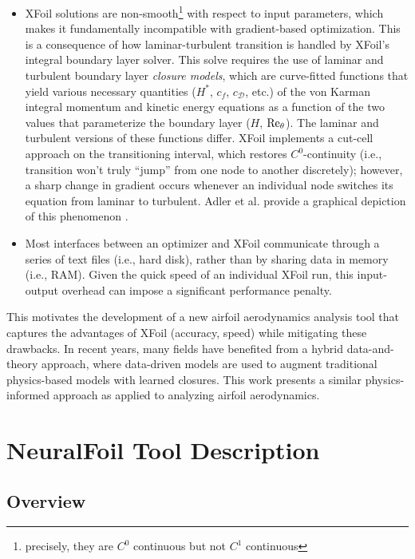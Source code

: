 \documentclass[conf]{new-aiaa}
\begin{document}
\begin{itemize}
        \item XFoil solutions are non-smooth\footnote{precisely, they are $C^0$ continuous but not $C^1$ continuous} with respect to input parameters, which makes it fundamentally incompatible with gradient-based optimization. This is a consequence of how laminar-turbulent transition is handled by XFoil's integral boundary layer solver. This solve requires the use of laminar and turbulent boundary layer \emph{closure models}, which are curve-fitted functions that yield various necessary quantities ($H^*$, $c_f$, $c_\mathcal{D}$, etc.) of the von Karman integral momentum and kinetic energy equations as a function of the two values that parameterize the boundary layer ($H$, $\rm Re_\theta$). The laminar and turbulent versions of these functions differ. XFoil implements a cut-cell approach on the transitioning interval, which restores $C^0$-continuity (i.e., transition won't truly ``jump'' from one node to another discretely); however, a sharp change in gradient occurs whenever an individual node switches its equation from laminar to turbulent. Adler et al. provide a graphical depiction of this phenomenon \cite{adler_cfd_2022}.
        \item Most interfaces between an optimizer and XFoil communicate through a series of text files (i.e., hard disk), rather than by sharing data in memory (i.e., RAM). Given the quick speed of an individual XFoil run, this input-output overhead can impose a significant performance penalty.
    \end{itemize}

    This motivates the development of a new airfoil aerodynamics analysis tool that captures the advantages of XFoil (accuracy, speed) while mitigating these drawbacks. In recent years, many fields have benefited from a hybrid data-and-theory approach, where data-driven models are used to augment traditional physics-based models with learned closures. This work presents a similar physics-informed approach as applied to analyzing airfoil aerodynamics.



    \section{NeuralFoil Tool Description}

    \subsection{Overview}
\end{document}
